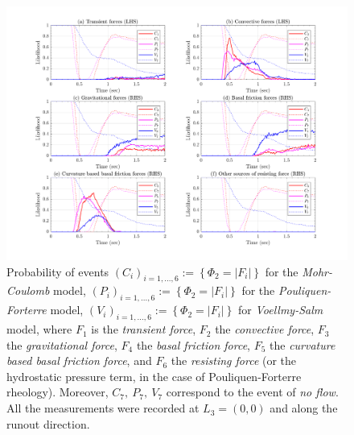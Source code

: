 \documentclass{article}
\begin{document}
\begin{figure}[H]
        \centering
        \includegraphics[width=1\textwidth]{InclinedPlane/LocalRecords/DominancePrX_L3.png}
        \caption{Probability of events $(C_i)_{i=1,...,6}:=\left\{\Phi_2=|F_i|\right\}$ for the \emph{Mohr-Coulomb} model, $(P_i)_{i=1,...,6}:=\left\{\Phi_2=|F_i|\right\}$ for the \emph{Pouliquen-Forterre} model, $(V_i)_{i=1,...,6}:=\left\{\Phi_2=|F_i|\right\}$ for \emph{Voellmy-Salm} model, where $F_1$ is the \emph{transient force}, $F_2$ the \emph{convective force}, $F_3$ the \emph{gravitational force}, $F_4$ the \emph{basal friction force}, $F_5$ the \emph{curvature based basal friction force}, and $F_6$ the \emph{resisting force} (or the hydrostatic pressure term, in the case of Pouliquen-Forterre rheology). Moreover, $C_7,\ P_7,\ V_7$ correspond to the event of \emph{no flow}. All the measurements were recorded at $L_3=(0,0)$ and along the runout direction.}
        \label{fig:Ramp-FXDominance-L3}
\end{figure}
\end{document}
